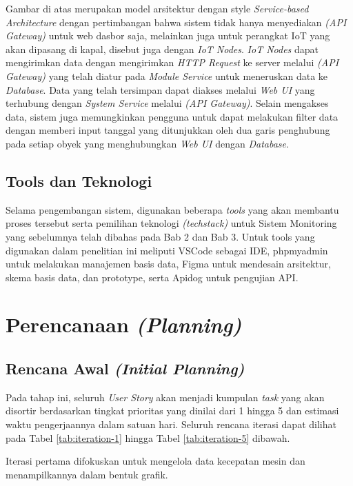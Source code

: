 Gambar di atas merupakan model arsitektur dengan style \textit{Service-based Architecture} dengan pertimbangan bahwa sistem tidak hanya menyediakan \textit{(API Gateway)} untuk web dasbor saja, melainkan juga untuk perangkat IoT yang akan dipasang di kapal, disebut juga dengan \textit{IoT Nodes}. \textit{IoT Nodes} dapat mengirimkan data dengan mengirimkan \textit{HTTP Request} ke server melalui \textit{(API Gateway)} yang telah diatur pada \textit{Module Service} untuk meneruskan data ke \textit{Database}. Data yang telah tersimpan dapat diakses melalui \textit{Web UI} yang terhubung dengan \textit{System Service} melalui \textit{(API Gateway)}. Selain mengakses data, sistem juga memungkinkan pengguna untuk dapat melakukan filter data dengan memberi input tanggal yang ditunjukkan oleh dua garis penghubung pada setiap obyek yang menghubungkan \textit{Web UI} dengan \textit{Database}.

\subsection{Tools dan Teknologi}

Selama pengembangan sistem, digunakan beberapa \textit{tools} yang akan membantu proses tersebut serta pemilihan teknologi \textit{(techstack)} untuk Sistem Monitoring yang sebelumnya telah dibahas pada Bab 2 dan Bab 3. Untuk tools yang digunakan dalam penelitian ini meliputi VSCode sebagai IDE, phpmyadmin untuk melakukan manajemen basis data, Figma untuk mendesain arsitektur, skema basis data, dan prototype, serta Apidog untuk pengujian API.

\section{Perencanaan \textit{(Planning)}}

\subsection{Rencana Awal \textit{(Initial Planning)}}

Pada tahap ini, seluruh \textit{User Story} akan menjadi kumpulan \textit{task} yang akan disortir berdasarkan tingkat prioritas yang dinilai dari 1 hingga 5 dan estimasi waktu pengerjaannya dalam satuan hari. Seluruh rencana iterasi dapat dilihat pada Tabel \ref{tab:iteration-1} hingga Tabel \ref{tab:iteration-5} dibawah.

Iterasi pertama difokuskan untuk mengelola data kecepatan mesin dan menampilkannya dalam bentuk grafik.

